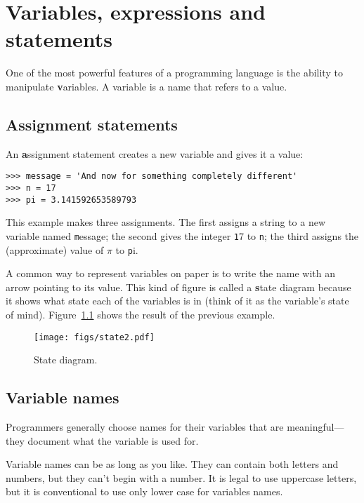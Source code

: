 \documentclass[
DIV=11,
fontsize=12,
twoside,
headinclude=false,
titlepage=firstiscover,
abstract=true,
headsepline=true,
footsepline=true,
chapterprefix=true, %
headings=big,
bibliography=totoc,%
captions=tableheading
]{scrbook}
\theoremstyle{definition}
\begin{document}
\chapter{Variables, expressions and statements}

One of the most powerful features of a programming language is the
ability to manipulate {\textbf variables}.  A variable is a name that
refers to a value.


\section{Assignment statements}
\label{variables}

An {\textbf assignment statement} creates a new variable and gives
it a value:

\begin{lstlisting}
>>> message = 'And now for something completely different'
>>> n = 17
>>> pi = 3.141592653589793
\end{lstlisting}
%
This example makes three assignments.  The first assigns a string
to a new variable named {\texttt message};
the second gives the integer {\texttt 17} to {\texttt n}; the third
assigns the (approximate) value of $\pi$ to {\texttt pi}.

A common way to represent variables on paper is to write the name with
an arrow pointing to its value.  This kind of figure is
called a {\textbf state diagram} because it shows what state each of the
variables is in (think of it as the variable's state of mind).
Figure~\ref{fig.state2} shows the result of the previous example.

\begin{figure}
\centerline
{\texttt{[image: figs/state2.pdf]}}
\caption{State diagram.}
\label{fig.state2}
\end{figure}



\section{Variable names}

Programmers generally choose names for their variables that
are meaningful---they document what the variable is used for.

Variable names can be as long as you like.  They can contain
both letters and numbers, but they can't begin with a number.
It is legal to use uppercase letters, but it is conventional
to use only lower case for variables names.
\end{document}
